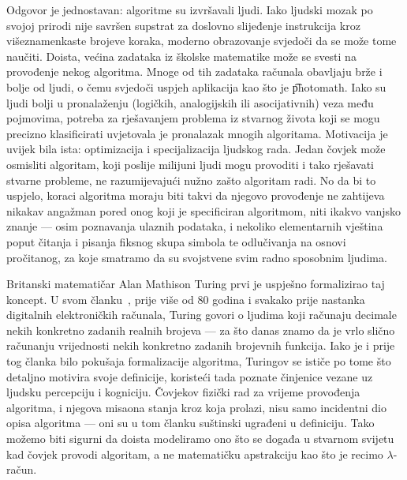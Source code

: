 Odgovor je jednostavan: algoritme su izvršavali ljudi. Iako ljudski mozak po svojoj prirodi nije savršen supstrat za doslovno slijeđenje instrukcija kroz višeznamenkaste brojeve koraka, moderno obrazovanje svjedoči da se može tome na\-u\-či\-ti. Doista, većina zadataka iz školske matematike može se svesti na provođenje nekog algoritma. Mnoge od tih zadataka računala obavljaju brže i bolje od ljudi, o čemu svjedoči uspjeh aplikacija kao što je \t{photomath}. Iako su ljudi bolji u pronalaženju (logičkih, analogijskih ili asocijativnih) veza među pojmovima, potreba za rješavanjem problema iz stvarnog života koji se mogu precizno klasificirati uvjetovala je pronalazak mnogih algoritama. Motivacija je uvijek bila ista: optimizacija i specijalizacija ljudskog rada. Jedan čovjek može osmisliti algoritam, koji poslije milijuni ljudi mogu provoditi i tako rješavati stvarne probleme, ne razumijevajući nužno zašto algoritam radi. No da bi to uspjelo, koraci algoritma moraju biti takvi da njegovo provođenje ne zahtijeva nikakav angažman pored onog koji je specificiran algoritmom, niti ikakvo vanjsko znanje --- osim poznavanja ulaznih podataka, i nekoliko elementarnih vještina poput čitanja i pisanja fiksnog skupa simbola te odlučivanja na osnovi pročitanog, za koje smatramo da su svojstvene svim radno sposobnim ljudima.

Britanski matematičar Alan Mathison Turing prvi je uspješno formalizirao taj koncept. U svom članku~\cite{turing}, prije više od 80 godina i svakako prije nastanka digitalnih elektroničkih računala, Turing govori o ljudima koji računaju decimale nekih konkretno zadanih realnih brojeva --- za što danas znamo da je vrlo slično računanju vrijednosti nekih konkretno zadanih brojevnih funkcija. Iako je i prije tog članka bilo pokušaja formalizacije algoritma, Turingov se ističe po tome što detaljno motivira svoje definicije, koristeći tada poznate činjenice vezane uz ljudsku percepciju i kogniciju. Čovjekov fizički rad za vrijeme provođenja algoritma, i njegova misaona stanja kroz koja prolazi, nisu samo incidentni dio opisa algoritma --- oni su u tom članku suštinski ugrađeni u definiciju. Tako možemo biti sigurni da doista modeliramo ono što se događa u stvarnom svijetu kad čovjek provodi algoritam, a ne matematičku apstrakciju kao što je recimo $\lambda$-račun.


